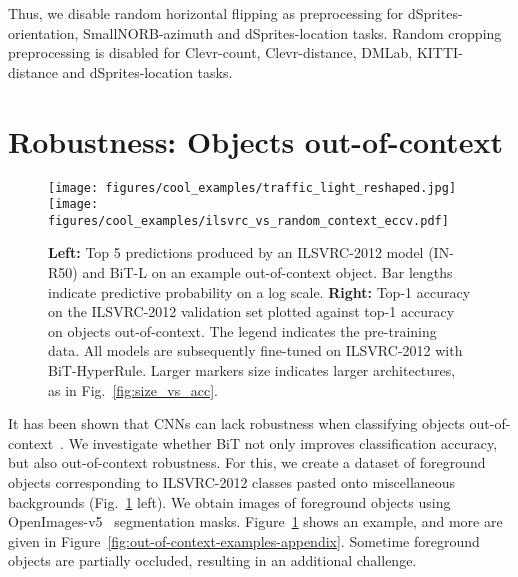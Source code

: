 \documentclass[runningheads]{llncs}
\newcommand{\name}{{BiT}}
\newcommand{\hyper}{{BiT-HyperRule}}
\newcommand{\imagenet}{{ILSVRC-2012}}
\begin{document}
Thus, we disable random horizontal flipping as preprocessing for dSprites-orientation,  SmallNORB-azimuth and dSprites-location tasks. 
Random cropping preprocessing is disabled for Clevr-count,  Clevr-distance, DMLab, KITTI-distance and dSprites-location tasks.



\clearpage

\section{Robustness: Objects out-of-context}

\label{sec:random-context}

\begin{figure}[t]
\begin{center}
   \texttt{[image: figures/cool\_examples/traffic\_light\_reshaped.jpg]}
   \texttt{[image: figures/cool\_examples/ilsvrc\_vs\_random\_context\_eccv.pdf]}
\end{center}
\caption{
\textbf{Left:}
Top 5 predictions produced by an \imagenet{} model (IN-R50) and \name{}-L on an example out-of-context object. 
Bar lengths indicate predictive probability on a log scale.
\textbf{Right:}
Top-1 accuracy on the \imagenet{} validation set plotted against top-1 accuracy on objects out-of-context.
The legend indicates the pre-training data. All models are subsequently fine-tuned on \imagenet{} with \hyper{}.
Larger markers size indicates larger architectures, as in Fig.~\ref{fig:size_vs_acc}.} 
\label{fig:random-context}
\end{figure}

It has been shown that CNNs can lack robustness when classifying objects out-of-context~\cite{beery2018,peyre2017,shetty2018}. 
We investigate whether BiT not only improves classification accuracy, but also out-of-context robustness.
For this, we create a dataset of foreground objects corresponding to \imagenet{} classes pasted onto miscellaneous backgrounds (Fig.~\ref{fig:random-context} left). 
We obtain images of foreground objects using OpenImages-v5~\cite{OpenImages} segmentation masks.
Figure~\ref{fig:random-context} shows an example, and more are given in Figure~\ref{fig:out-of-context-examples-appendix}.
Sometime foreground objects are partially occluded, resulting in an additional challenge. 
\end{document}
